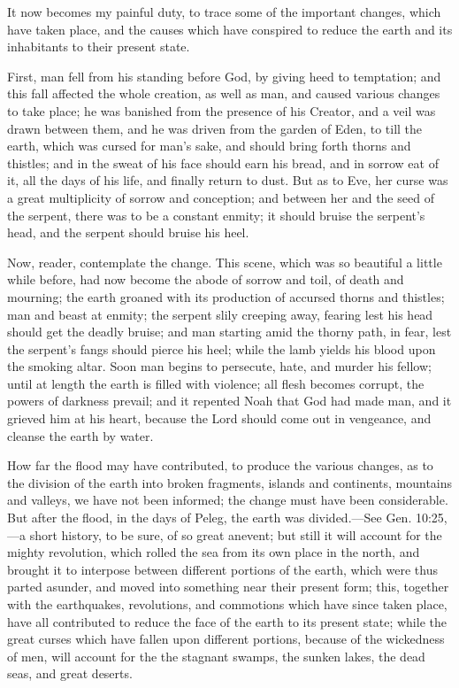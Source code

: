It now becomes my painful duty, to trace some of the important changes, which have taken
place, and the causes which have conspired to reduce the earth and its inhabitants to their
present state.

First, man fell from his standing before God, by giving heed to temptation; and this fall
affected the whole creation, as well as man, and caused various changes to take place; he was
banished from the presence of his Creator, and a veil was drawn between them, and he was
driven from the garden of Eden, to till the earth, which was cursed for man's sake, and should
bring forth thorns and thistles; and in the sweat of his face should earn his bread, and in
sorrow eat of it, all the days of his life, and finally return to dust. But as to Eve, her curse was
a great multiplicity of sorrow and conception; and between her and the seed of the serpent,
there was to be a constant enmity; it should bruise the serpent's head, and the serpent should
bruise his heel.

Now, reader, contemplate the change. This scene, which was so beautiful a little while
before, had now become the abode of sorrow and toil, of death and mourning; the earth
groaned with its production of accursed thorns and thistles; man and beast at enmity; the
serpent slily creeping away, fearing lest his head should get the deadly bruise; and man
starting amid the thorny path, in fear, lest the serpent's fangs should pierce his heel; while the
lamb yields his blood upon the smoking altar. Soon man begins to persecute, hate, and
murder his fellow; until at length the earth is filled with violence; all flesh becomes corrupt,
the powers of darkness prevail; and it repented Noah that God had made man, and it grieved
him at his heart, because the Lord should come out in vengeance, and cleanse the earth by
water.

How far the flood may have contributed, to produce the various changes, as to the division of
the earth into broken fragments, islands and continents, mountains and valleys, we have not
been informed; the change must have been considerable. But after the flood, in the days of
Peleg, the earth was divided.—See Gen. 10:25,—a short history, to be sure, of so great anevent; but still it will account for the mighty revolution, which rolled the sea from its own
place in the north, and brought it to interpose between different portions of the earth, which
were thus parted asunder, and moved into something near their present form; this, together
with the earthquakes, revolutions, and commotions which have since taken place, have all
contributed to reduce the face of the earth to its present state; while the great curses which
have fallen upon different portions, because of the wickedness of men, will account for the
the stagnant swamps, the sunken lakes, the dead seas, and great deserts.

